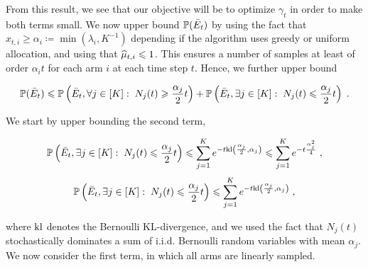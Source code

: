 From this result, we see that our objective will be to optimize $\gamma_t$ in order to make both terms small. We now upper bound $\mathbb{P}(\bar E_t)$ by using the fact that $x_{t,i}\geq \alpha_i \coloneqq \min(\lambda_i, K^{-1})$ depending if the algorithm uses greedy or uniform allocation, and using that $\widehat{\mu}_{t, i}\leqslant 1$. This ensures a number of samples at least of order $\alpha_i t$ for each arm $i$ at each time step $t$. Hence, we further upper bound 

\[\mathbb{P}(\bar E_t) \leqslant \mathbb{P}\left(\bar E_t, \forall j \in [K]:\; N_j(t)\geqslant \frac{\alpha_j}{2}t\right) + \mathbb{P}\left(\bar E_t, \exists j \in [K]:\; N_j(t)\leqslant \frac{\alpha_j}{2}t\right) \;. \]  

We start by upper bounding the second term, 

\begin{align*}
\mathbb{P}\left(\bar E_t, \exists j \in [K]:\; N_j(t) \leqslant  \frac{\alpha_j}{2}t\right) \leqslant \sum_{j=1}^K e^{-t \text{\normalfont kl}\left(\frac{\alpha_j}{2}, \alpha_j\right)} \leqslant \sum_{j=1}^K e^{-t \frac{\alpha_j^2}{4}} \;,
\end{align*}
\begin{equation}\label{eq::linearly_sampled}
\mathbb{P}\left(\bar E_t, \exists j \in [K]:\; N_j(t) \leqslant  \frac{\alpha_j}{2}t\right) \leqslant \sum_{j=1}^K e^{-t \text{\normalfont kl}\left(\frac{\alpha_j}{2}, \alpha_j\right)} \;,
\end{equation}

where $\text{\normalfont kl}$ denotes the Bernoulli KL-divergence, and we used the fact that $N_j(t)$ stochastically dominates a sum of i.i.d. Bernoulli random variables with mean $\alpha_j$. We now consider the first term, in which all arms are linearly sampled.


